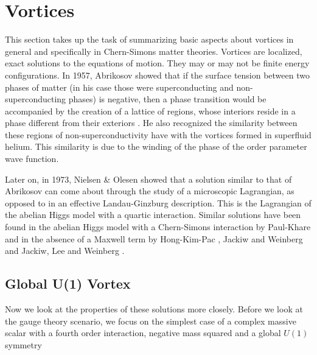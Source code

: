         \section{Vortices} \label{vortices_sec}
        This section takes up the task of summarizing basic aspects about vortices in general and specifically in Chern-Simons matter theories.
        Vortices are localized, exact solutions to the equations of motion. They may or may not be finite energy configurations.
        In 1957, Abrikosov  showed that if the surface tension between two phases of matter (in his case those were superconducting and non-superconducting phases) is negative, then a phase transition would be accompanied by the creation of a lattice of regions, whose interiors reside in a phase different from their exteriors \cite{Abrikosov1957}. He also recognized the similarity between these regions of non-superconductivity have with the vortices formed in superfluid helium. This similarity is due to the winding of the phase of the order parameter wave function.


        Later on, in 1973, Nielsen \& Olesen \cite{Nielsen1973} showed that a solution similar to that of Abrikosov can come about through the study of a microscopic Lagrangian, as opposed to in an effective Landau-Ginzburg description. This is the Lagrangian of the abelian Higgs model with a quartic interaction. Similar solutions have been found in the abelian Higgs model with a Chern-Simons interaction by Paul-Khare \cite{Paul1986} and in the absence of a Maxwell term by Hong-Kim-Pac \cite{Hong1990}, Jackiw and Weinberg \cite{Jackiw1990a} and Jackiw, Lee and Weinberg \cite{Jackiw1990b}.

        \subsection{Global U(1) Vortex}

        Now we look at the properties of these solutions more closely. Before we look at the gauge theory scenario, we focus on the simplest case of a complex massive scalar with a fourth order interaction, negative mass squared and a global $U(1)$ symmetry

